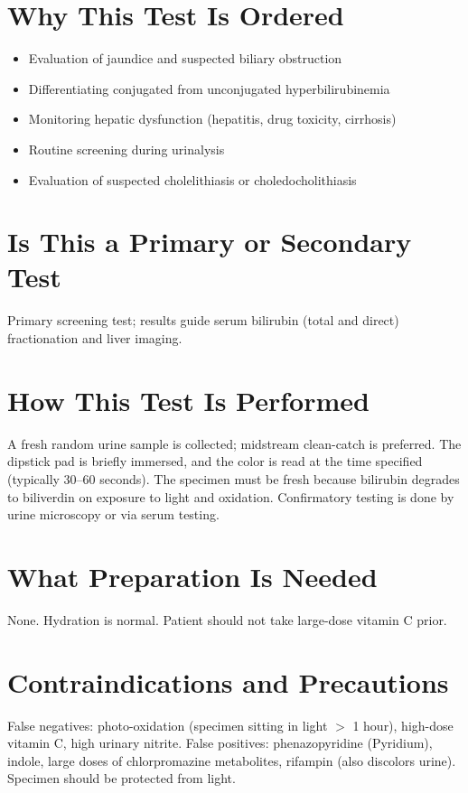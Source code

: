 \section*{Why This Test Is Ordered}
\begin{itemize}
  \item Evaluation of jaundice and suspected biliary obstruction
  \item Differentiating conjugated from unconjugated hyperbilirubinemia
  \item Monitoring hepatic dysfunction (hepatitis, drug toxicity, cirrhosis)
  \item Routine screening during urinalysis
  \item Evaluation of suspected cholelithiasis or choledocholithiasis
\end{itemize}

\section*{Is This a Primary or Secondary Test}
Primary screening test; results guide serum bilirubin (total and direct) fractionation and liver imaging.

\section*{How This Test Is Performed}
A fresh random urine sample is collected; midstream clean-catch is preferred. The dipstick pad is briefly immersed, and the color is read at the time specified (typically 30--60 seconds). The specimen must be fresh because bilirubin degrades to biliverdin on exposure to light and oxidation. Confirmatory testing is done by urine microscopy or via serum testing.

\section*{What Preparation Is Needed}
None. Hydration is normal. Patient should not take large-dose vitamin C prior.

\section*{Contraindications and Precautions}
False negatives: photo-oxidation (specimen sitting in light $>$ 1 hour), high-dose vitamin C, high urinary nitrite. False positives: phenazopyridine (Pyridium), indole, large doses of chlorpromazine metabolites, rifampin (also discolors urine). Specimen should be protected from light.

